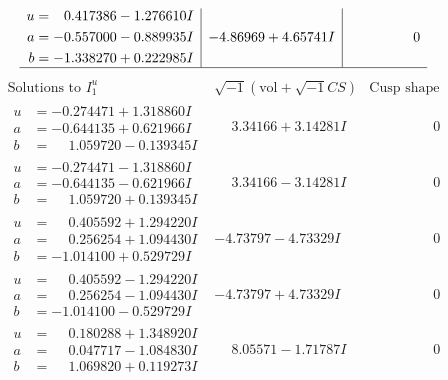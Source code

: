 \documentclass[1p]{elsarticle_modified}
\theoremstyle{definition}
\newcommand{\I}{\sqrt{-1}}
\begin{document}
$$\begin{array}{c|c|c}
\begin{aligned}
u &= \phantom{-}0.417386 - 1.276610 I \\
a &= -0.557000 - 0.889935 I \\
b &= -1.338270 + 0.222985 I\end{aligned}
 & -4.86969 + 4.65741 I & \phantom{-0.000000 } 0\\
 \hline 
 \end{array}$$\newpage$$\begin{array}{c|c|c}  
\text{Solutions to }I^u_{1}& \I (\text{vol} + \sqrt{-1}CS) & \text{Cusp shape}\\
 \hline 
\begin{aligned}
u &= -0.274471 + 1.318860 I \\
a &= -0.644135 + 0.621966 I \\
b &= \phantom{-}1.059720 - 0.139345 I\end{aligned}
 & \phantom{-}3.34166 + 3.14281 I & \phantom{-0.000000 } 0 \\ \hline\begin{aligned}
u &= -0.274471 - 1.318860 I \\
a &= -0.644135 - 0.621966 I \\
b &= \phantom{-}1.059720 + 0.139345 I\end{aligned}
 & \phantom{-}3.34166 - 3.14281 I & \phantom{-0.000000 } 0 \\ \hline\begin{aligned}
u &= \phantom{-}0.405592 + 1.294220 I \\
a &= \phantom{-}0.256254 + 1.094430 I \\
b &= -1.014100 + 0.529729 I\end{aligned}
 & -4.73797 - 4.73329 I & \phantom{-0.000000 } 0 \\ \hline\begin{aligned}
u &= \phantom{-}0.405592 - 1.294220 I \\
a &= \phantom{-}0.256254 - 1.094430 I \\
b &= -1.014100 - 0.529729 I\end{aligned}
 & -4.73797 + 4.73329 I & \phantom{-0.000000 } 0 \\ \hline\begin{aligned}
u &= \phantom{-}0.180288 + 1.348920 I \\
a &= \phantom{-}0.047717 - 1.084830 I \\
b &= \phantom{-}1.069820 + 0.119273 I\end{aligned}
 & \phantom{-}8.05571 - 1.71787 I & \phantom{-0.000000 } 0 \\ \hline\begin{aligned}

\end{aligned}
\end{array}$$
\end{document}
